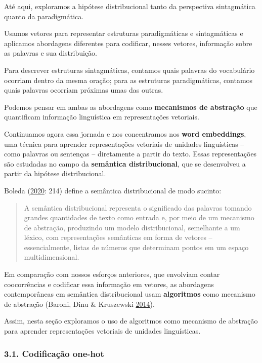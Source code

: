 \documentclass[
  brazilian,
]{article}
\begin{document}
Até aqui, exploramos a hipótese distribucional tanto da perspectiva
sintagmática quanto da paradigmática.

Usamos vetores para representar estruturas paradigmáticas e
sintagmáticas e aplicamos abordagens diferentes para codificar, nesses
vetores, informação sobre as palavras e sua distribuição.

Para descrever estruturas sintagmáticas, contamos quais palavras do
vocabulário ocorriam dentro da mesma oração; para as estruturas
paradigmáticas, contamos quais palavras ocorriam próximas umas das
outras.

Podemos pensar em ambas as abordagens como \textbf{mecanismos de
abstração} que quantificam informação linguística em representações
vetoriais.

Continuamos agora essa jornada e nos concentramos nos \textbf{word
embeddings}, uma técnica para aprender representações vetoriais de
unidades linguísticas -- como palavras ou sentenças -- diretamente a
partir do texto. Essas representações são estudadas no campo da
\textbf{semântica distribucional}, que se desenvolveu a partir da
hipótese distribucional.

Boleda
(\href{https://doi.org/10.1146/annurev-linguistics-011619-030303}{2020}:
214) define a semântica distribucional de modo sucinto:

\begin{quote}
A semântica distribucional representa o significado das palavras tomando
grandes quantidades de texto como entrada e, por meio de um mecanismo de
abstração, produzindo um modelo distribucional, semelhante a um léxico,
com representações semânticas em forma de vetores -- essencialmente,
listas de números que determinam pontos em um espaço multidimensional.
\end{quote}

Em comparação com nossos esforços anteriores, que envolviam contar
coocorrências e codificar essa informação em vetores, as abordagens
contemporâneas em semântica distribucional usam \textbf{algoritmos} como
mecanismo de abstração (Baroni, Dinu \& Kruszewski
\href{https://www.aclweb.org/anthology/P14-1023.pdf}{2014}).

Assim, nesta seção exploramos o uso de algoritmos como mecanismo de
abstração para aprender representações vetoriais de unidades
linguísticas.

\hypertarget{codificauxe7uxe3o-one-hot}{%
\subsubsection{3.1. Codificação
one-hot}\label{codificauxe7uxe3o-one-hot}}
\end{document}
